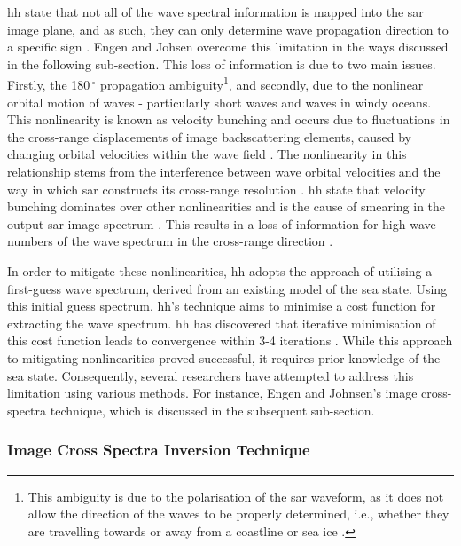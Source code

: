 \ac{hh} state that not all of the wave spectral information is mapped into the \acs{sar} image plane, and as such, they can only determine wave propagation direction to a specific sign \cite{Hasselmann1991}. Engen and Johsen \cite{Engen1995} overcome this limitation in the ways discussed in the following sub-section. This loss of information is due to two main issues. Firstly, the 180\,$^{\circ}$ propagation ambiguity\footnote{This ambiguity is due to the polarisation of the \acs{sar} waveform, as it does not allow the direction of the waves to be properly determined, i.e., whether they are travelling towards or away from a coastline or sea ice \cite{Fernandes2000}.}, and secondly, due to the nonlinear orbital motion of waves - particularly short waves and waves in windy oceans. This nonlinearity is known as velocity bunching and occurs due to fluctuations in the cross-range displacements of image backscattering elements, caused by changing orbital velocities within the wave field \cite{Hasselmann1991}. The nonlinearity in this relationship stems from the interference between wave orbital velocities and the way in which \acs{sar} constructs its cross-range resolution \cite{Mastenbroek2000}. \ac{hh} state that velocity bunching dominates over other nonlinearities and is the cause of smearing in the output \acs{sar} image spectrum \cite{Hasselmann1991}. This results in a loss of information for high wave numbers of the wave spectrum in the cross-range direction \cite{Hasselmann1991, Hasselmann1996}.

In order to mitigate these nonlinearities, \ac{hh} adopts the approach of utilising a first-guess wave spectrum, derived from an existing model of the sea state. Using this initial guess spectrum, \ac{hh}'s technique aims to minimise a cost function for extracting the wave spectrum. \ac{hh} has discovered that iterative minimisation of this cost function leads to convergence within 3-4 iterations \cite{Hasselmann1991}. While this approach to mitigating nonlinearities proved successful, it requires prior knowledge of the sea state. Consequently, several researchers have attempted to address this limitation using various methods. For instance, Engen and Johnsen's \cite{Engen1995} image cross-spectra technique, which is discussed in the subsequent sub-section.

\subsubsection{Image Cross Spectra Inversion Technique} \label{subsubsec:litReview.sarCharac.oceanWaveInversion.Engen}

